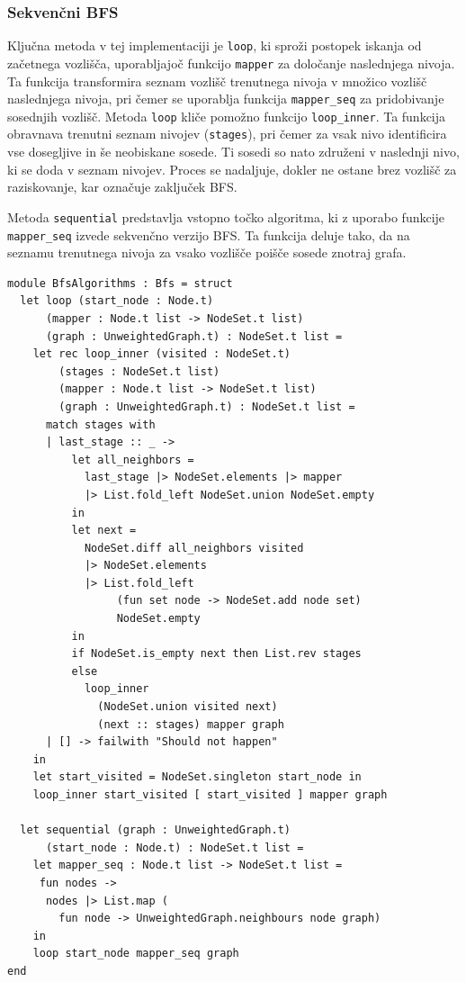 \documentclass[fin1, tisk]{fmfdelo}
\begin{document}
\subsubsection{Sekvenčni BFS}

Ključna metoda v tej implementaciji je \texttt{loop}, ki sproži postopek iskanja od začetnega vozlišča, uporabljajoč funkcijo
\texttt{mapper} za določanje naslednjega nivoja. Ta funkcija transformira seznam vozlišč trenutnega nivoja v množico
vozlišč naslednjega nivoja, pri čemer se uporablja funkcija \texttt{mapper\_seq} za pridobivanje sosednjih vozlišč.
Metoda \texttt{loop} kliče pomožno funkcijo \texttt{loop\_inner}. Ta funkcija obravnava trenutni seznam
nivojev (\texttt{stages}), pri čemer za vsak nivo identificira vse dosegljive in še neobiskane sosede.
Ti sosedi so nato združeni v naslednji nivo, ki se doda v seznam nivojev. Proces se nadaljuje, dokler ne ostane brez
vozlišč za raziskovanje, kar označuje zaključek BFS.

Metoda \texttt{sequential} predstavlja vstopno točko algoritma, ki z uporabo funkcije \texttt{mapper\_seq} izvede
sekvenčno verzijo BFS. Ta funkcija deluje tako, da na seznamu trenutnega nivoja za vsako vozlišče poišče sosede znotraj grafa.

\begin{lstlisting}[label=lst:bfs_sequential]
module BfsAlgorithms : Bfs = struct
  let loop (start_node : Node.t)
      (mapper : Node.t list -> NodeSet.t list)
      (graph : UnweightedGraph.t) : NodeSet.t list =
    let rec loop_inner (visited : NodeSet.t) 
        (stages : NodeSet.t list)
        (mapper : Node.t list -> NodeSet.t list) 
        (graph : UnweightedGraph.t) : NodeSet.t list =
      match stages with
      | last_stage :: _ ->
          let all_neighbors =
            last_stage |> NodeSet.elements |> mapper
            |> List.fold_left NodeSet.union NodeSet.empty
          in
          let next =
            NodeSet.diff all_neighbors visited
            |> NodeSet.elements
            |> List.fold_left
                 (fun set node -> NodeSet.add node set)
                 NodeSet.empty
          in
          if NodeSet.is_empty next then List.rev stages
          else
            loop_inner
              (NodeSet.union visited next)
              (next :: stages) mapper graph
      | [] -> failwith "Should not happen"
    in
    let start_visited = NodeSet.singleton start_node in
    loop_inner start_visited [ start_visited ] mapper graph

  let sequential (graph : UnweightedGraph.t) 
      (start_node : Node.t) : NodeSet.t list =
    let mapper_seq : Node.t list -> NodeSet.t list =
     fun nodes ->
      nodes |> List.map (
        fun node -> UnweightedGraph.neighbours node graph)
    in
    loop start_node mapper_seq graph
end
\end{lstlisting}
\end{document}
